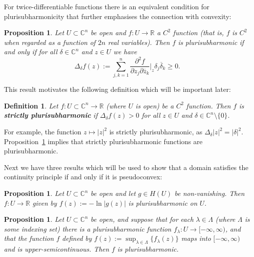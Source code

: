 \documentclass[11pt,a4paper, final, twoside]{article}
\newtheorem{definition}[theorem]{Definition}
\newtheorem{proposition}[theorem]{Proposition}
\numberwithin{equation}{section}
\newcommand{\C}{\mathbb C}
\newcommand{\R}{\mathbb R}
\newcommand{\con}[1]{\overline{#1}}
\newcommand{\hol}{H}
\newcommand{\cts}{C}
\begin{document}
For twice-differentiable functions there is an equivalent condition for plurisubharmonicity that further emphasises the connection with convexity:
\begin{proposition}
\label{leviformpsh}
Let $U\subset\C^n$ be open and $f\colon U\to\R$ a $\cts^2$ function (that is, $f$ is $\cts^2$ when regarded as a function of $2n$ real variables). 
Then $f$ is plurisubharmonic if and only if for all $\delta\in\C^n$ and $z\in U$ we have
$$\Delta_\delta f(z):=\sum_{j,k=1}^n\frac{\partial^2 f}{\partial z_j\partial\con z_k}\bigg|_z\delta_j\con\delta_k \geq 0.$$
\end{proposition}
This result motivates the following definition which will be important later:
\begin{definition}
Let $f\colon U\subset \C^n\to\R$ (where $U$ is open) be a $\cts^2$ function. Then $f$ is \textbf{strictly plurisubharmonic} if $\Delta_\delta f(z)>0$ for all $z\in U$ and
$\delta\in\C^n\setminus\{0\}$.
\end{definition}
For example, the function $z\mapsto |z|^2$ is strictly plurisubharmonic, as $\Delta_\delta |z|^2 = |\delta|^2$. Proposition~\ref{leviformpsh} implies that strictly plurisubharmonic functions are plurisubharmonic.


Next we have three results which will be used
to show that a domain satisfies the continuity principle if and only if it is pseudoconvex:
\begin{proposition}
\label{pshhol}
Let $U\subset\C^n$ be open and let $g\in\hol(U)$ be non-vanishing. Then $f\colon U\to\R$ given by $f(z):=-\ln|g(z)|$ is plurisubharmonic on $U$.
\end{proposition}

\begin{proposition}
\label{pshupper}
Let $U\subset\C^n$ be open, and suppose that for each $\lambda\in\Lambda$ (where $\Lambda$ is some indexing set) there is a plurisubharmonic function $f_\lambda\colon U\to [-\infty,\infty)$, and that
the function $f$ defined by $f(z):=\sup_{\lambda\in\Lambda}\{f_\lambda(z)\}$ maps into $[-\infty,\infty)$ and is upper-semicontinuous. Then $f$ is plurisubharmonic.
\end{proposition}
\end{document}

